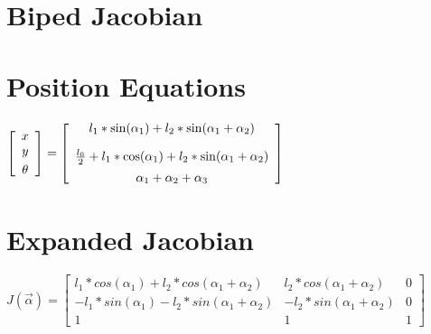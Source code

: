 \documentclass[20pt]{article}
\begin{document}
	\section*{Biped Jacobian}
		\begin{center}
		\end{center}
	
	\section*{Position Equations}
		\vspace{10pt}
		\begin{center}
		$\left[\begin{array}{c}
			x \\ y \vspace{3pt}\\ \theta
		\end{array}\right]	
		=
		\left[\begin{array}{c}
			l_1*\sin(\alpha_1)
			+ l_2*\sin(\alpha_1+\alpha_2) \vspace{10pt}\\
			
			\frac{l_0}{2} + l_1*\cos(\alpha_1)
			+ l_2*\sin(\alpha_1+\alpha_2) \vspace{5pt} \\ 
			
			\alpha_1 + \alpha_2 + \alpha_3
		\end{array}\right]$
		\end{center}

	\vspace{4pt}
	\section*{Expanded Jacobian}
		\vspace{10pt}
		\begin{center}
			$J(\vec{\alpha}) = 
			\left[\begin{array}{ccc}
				l_1*cos(\alpha_1)+l_2*cos(\alpha_1+\alpha_2)
				& l_2*cos(\alpha_1+\alpha_2) & 0 \\
				
				-l_1*sin(\alpha_1)-l_2*sin(\alpha_1+\alpha_2)
				& -l_2*sin(\alpha_1+\alpha_2) & 0 \\
				
				1 & 1 & 1
			\end{array}\right]$
		\end{center}
\end{document}
